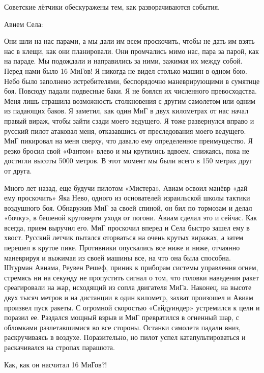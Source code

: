 Советские лётчики обескуражены тем, как разворачиваются события.

Авием Села:

\begin{textcitation}
	Они шли на нас парами, а мы дали им всем проскочить, чтобы не дать им взять нас в клещи, как они планировали. Они промчались мимо нас, пара за парой, как на параде. Мы подождали и направились за ними, зажимая их между собой. Перед нами было 16 МиГов! Я никогда не видел столько машин в одном бою. Небо было заполнено истребителями, беспорядочно маневрирующими в сумятице боя. Повсюду падали подвесные баки. Я не боялся их численного превосходства. Меня лишь страшила возможность столкновения с другим самолетом или одним из падающих баков. Я заметил, как один МиГ в двух километрах от нас начал правый вираж, чтобы зайти сзади моего ведущего. Я тоже развернулся вправо и русский пилот атаковал меня, отказавшись от преследования моего ведущего. МиГ пикировал на меня сверху, что давало ему определенное преимущество. Я резко бросил свой «Фантом» влево и мы крутились вдвоем, снижаясь, пока не достигли высоты 5000 метров. В этот момент мы были всего в 150 метрах друг от друга. 
	
	Много лет назад, еще будучи пилотом «Мистера», Авиам освоил манёвр «дай ему проскочить» Яка Нево, одного из основателей израильской школы тактики воздушного боя. Обнаружив МиГ за своей спиной, он бил по тормозам и делал «бочку», в бешеной круговерти уходя от погони. Авиам сделал это и сейчас. Как всегда, прием выручил его. МиГ проскочил вперед и Села быстро зашел ему в хвост. Русский летчик пытался оторваться на очень крутых виражах, а затем перешел в крутое пике. Противники опускались все ниже и ниже, отчаянно маневрируя и выжимая из своей машины все, на что она была способна. Штурман Авиама, Реувен Решеф, приник к приборам системы управления огнем, стремясь ни на секунду не пропустить сигнал о том, что головки наведения ракет среагировали на жар, исходящий из сопла двигателя МиГа. Наконец, на высоте двух тысяч метров и на дистанции в один километр, захват произошел и Авиам произвел пуск ракеты. С огромной скоростью «Сайдуиндер» устремился к цели и поразил ее. Раздался мощный взрыв и МиГ превратился в огненный шар, с обломками разлетавшимися во все стороны. Останки самолета падали вниз, раскручиваясь в воздухе. Поразительно, но пилот успел катапультироваться и раскачивался на стропах парашюта. 
\end{textcitation}

Как, как он насчитал 16 МиГов?!

